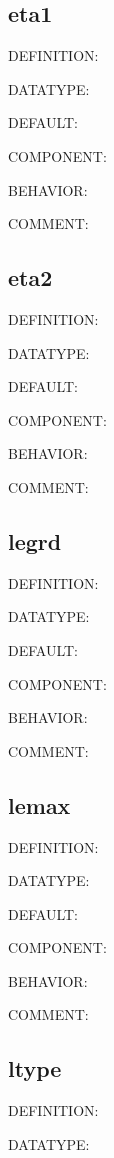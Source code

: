 \subsection{eta1}
{\color{red}DEFINITION:}

{\color{green}DATATYPE:}

{\color{blue}DEFAULT:}

{\color{brown}COMPONENT:}

{\color{purple}BEHAVIOR:}

{\color{olive}COMMENT:}

\subsection{eta2}
{\color{red}DEFINITION:}

{\color{green}DATATYPE:}

{\color{blue}DEFAULT:}

{\color{brown}COMPONENT:}

{\color{purple}BEHAVIOR:}

{\color{olive}COMMENT:}

\subsection{legrd}
{\color{red}DEFINITION:}

{\color{green}DATATYPE:}

{\color{blue}DEFAULT:}

{\color{brown}COMPONENT:}

{\color{purple}BEHAVIOR:}

{\color{olive}COMMENT:}

\subsection{lemax}
{\color{red}DEFINITION:}

{\color{green}DATATYPE:}

{\color{blue}DEFAULT:}

{\color{brown}COMPONENT:}

{\color{purple}BEHAVIOR:}

{\color{olive}COMMENT:}

\subsection{ltype}
{\color{red}DEFINITION:}

{\color{green}DATATYPE:}

